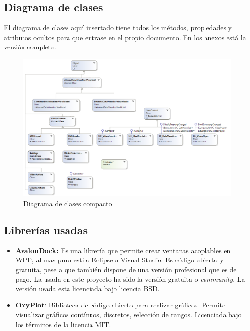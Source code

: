 \subsection{Diagrama de clases}
El diagrama de clases aqu\'i insertado tiene todos los m\'etodos, propiedades y atributos ocultos para que entrase
en el propio documento. En los anexos est\'a la versi\'on completa.

\begin{figure}[h]
\centering
\includegraphics[width=1.2\linewidth]{./Figures/ClassDiagram}
\caption[Diagrama de clases compacto]{Diagrama de clases compacto}
\label{fig:ClassDiagram}
\end{figure}

\subsection{Librer\'{i}as usadas}
\begin{itemize}
    \item \textbf{AvalonDock:} 
    Es una librer\'{i}a que permite crear ventanas acoplables en WPF, al mas puro estilo Eclipse o Visual Studio. Es
    c\'{o}digo abierto y gratuita, pese a que tambi\'{e}n dispone de una versi\'{o}n profesional que es de pago. La usada en este proyecto
    ha sido la versi\'{o}n gratuita o \emph{community}. La versi\'{o}n usada esta licenciada bajo licencia BSD.
    \item \textbf{OxyPlot:}
    Biblioteca de c\'odigo abierto para realizar gr\'aficos. Permite visualizar gr\'aficos cont\'inuos, discretos, 
    selecci\'on de rangos. Licenciada bajo los t\'erminos de la licencia MIT.
\end{itemize}

